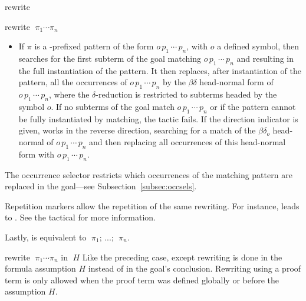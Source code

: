 \begin{tactic}{rewrite}
\begin{tsyntax}{rewrite $\;\pi_1 \cdots \pi_n$}
\begin{itemize}
    \item If $\pi$ is a \ec{/}-prefixed pattern of the form
      $o\,p_1\,\cdots\,p_n$, with $o$ a defined symbol, then
       searches for the first subterm of the goal matching
      $o\,p_1\,\cdots\,p_n$ and resulting in the full instantiation of
      the pattern. It then replaces, after instantiation of the
      pattern, all the occurrences of $o\,p_1\,\cdots\,p_n$ by the
      $\beta\delta$ head-normal form of $o\,p_1\,\cdots\,p_n$, where
      the $\delta$-reduction is restricted to subterms headed by the
      symbol $o$. If no subterms of the goal match
      $o\,p_1\,\cdots\,p_n$
      or if the pattern cannot be fully instantiated by matching, the
      tactic fails. If the direction indicator \ec{-} is given,
       works in the reverse direction, searching for a
      match of the $\beta\delta_o$
      head-normal of $o\,p_1\,\cdots\,p_n$
      and then replacing all occurrences of this head-normal form with
      $o\,p_1\,\cdots\,p_n$.
    \end{itemize}
    
    \smallskip
    The occurrence selector restricts which occurrences of the
    matching pattern are replaced in the goal---see
    Subsection~\ref{subsec:occsels}.

    Repetition markers allow the repetition of the same rewriting. For
    instance,  leads to . See the tactical  for more information.
    
    Lastly,  is equivalent to
     $\;\pi_1$; ...;  $\;\pi_n$.
  \end{tsyntax}

  \begin{tsyntax}{rewrite $\;\pi_1 \cdots \pi_n$ in $\;H$} Like the
    preceding case, except rewriting is done in the formula assumption
    $H$ instead of in the goal's conclusion.  Rewriting using a proof
    term is only allowed when the proof term was defined globally
    or before the assumption $H$.
  \end{tsyntax}
\end{tactic}

